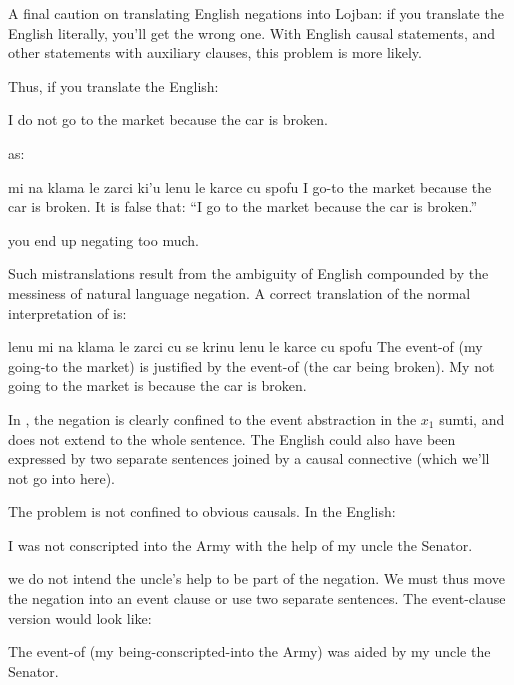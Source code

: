 A final caution on translating English negations into
    Lojban: if you translate the English literally, you'll get the
    wrong one. With English causal statements, and other statements
    with auxiliary clauses, this problem is more likely.

Thus, if you translate the English:
\begin{example}
I do not go to the market because the car is broken.
\end{example}

{\noindent}as:
\begin{example}
mi na klama le zarci ki'u lenu le karce cu spofu\n
I  go-to the market because the car is broken.\n
It is false that: ``I go to the market because the car\n
\T	is broken.''
\end{example}

{\noindent}you end up negating too much. 

Such mistranslations result from the ambiguity of English
    compounded by the messiness of natural language negation. A
    correct translation of the normal interpretation of  is:
\begin{example}
lenu mi na klama le zarci\n
\T	cu se krinu\n
\T	lenu le karce cu spofu\n
The event-of (my  going-to the market)\n
\T	is justified by\n
\T	the event-of (the car being broken).\n
My not going to the market is because the car is broken.
\end{example}

In , the negation is
    clearly confined to the event abstraction in the $x_1$ sumti, and
    does not extend to the whole sentence. The English could also
    have been expressed by two separate sentences joined by a
    causal connective (which we'll not go into here).

The problem is not confined to obvious causals. In the
    English:
\begin{example}
I was not conscripted into the Army with the help of\n
\T	my uncle the Senator.
\end{example}

{\noindent}we do not intend the uncle's help to be part of the negation.
    We must thus move the negation into an event clause or use two
    separate sentences. The event-clause version would look like:
\begin{example}
The event-of (my  being-conscripted-into\n
\T	the Army) was aided by my uncle the Senator.
\end{example}

